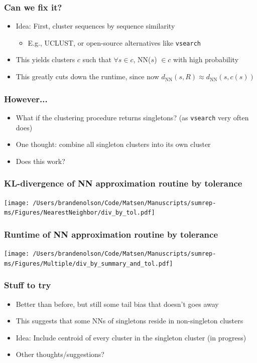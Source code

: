 \documentclass[mathserif,compress]{beamer}
\renewcommand\;{\,}
\begin{document}
\begin{frame}\frametitle{Can we fix it?}
\begin{itemize}
\item
Idea: First, cluster sequences by sequence similarity
\begin{itemize}
\smallskip
\item E.g., UCLUST, or open-source alternatives like \texttt{vsearch}
\end{itemize}
\bigskip
\item
This yields clusters $c$ such that $\forall s \in c$, NN($s$) $\in c$ with high probability
\bigskip
\item
This greatly cuts down the runtime, since now $d_\text{NN}(s, R) \approx d_\text{NN}(s, c(s))$
\end{itemize}
\end{frame}

\begin{frame}\frametitle{However...}
\begin{itemize}
\item
What if the clustering procedure returns singletons? (as \texttt{vsearch} very often does)
\bigskip
\item
One thought: combine all singleton clusters into its own cluster
\bigskip
\item
Does this work?
\end{itemize}
\end{frame}

\begin{frame}\frametitle{KL-divergence of NN approximation routine by tolerance}
\begin{center}
\texttt{[image: /Users/brandenolson/Code/Matsen/Manuscripts/sumrep-ms/Figures/NearestNeighbor/div\_by\_tol.pdf]}
\end{center}
\end{frame}

\begin{frame}\frametitle{Runtime of NN approximation routine by tolerance}
\begin{center}
\texttt{[image: /Users/brandenolson/Code/Matsen/Manuscripts/sumrep-ms/Figures/Multiple/div\_by\_summary\_and\_tol.pdf]}
\end{center}
\end{frame}

\begin{frame}\frametitle{Stuff to try}
\begin{itemize}
\item
Better than before, but still some tail bias that doesn't goes away
\bigskip
\item
This suggests that some NNs of singletons reside in non-singleton clusters
\bigskip
\item
Idea: Include centroid of every cluster in the singleton cluster (in progress)
\bigskip
\item
Other thoughts/suggestions?

\end{itemize}
\end{frame}
\end{document}
